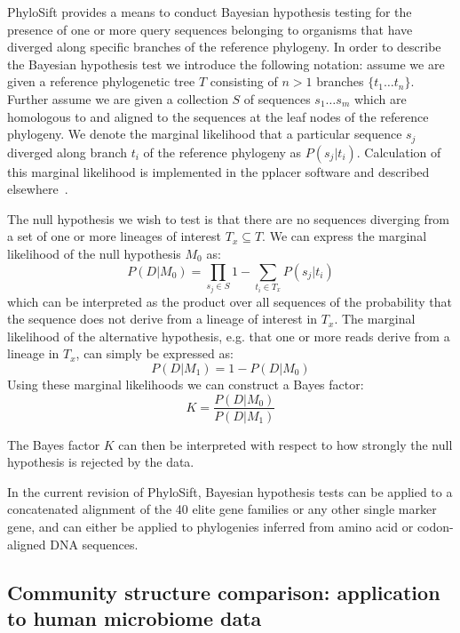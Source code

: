 \documentclass[10pt]{article}
\begin{document}
PhyloSift provides a means to conduct Bayesian hypothesis testing for the presence of one or more query sequences belonging to organisms that have diverged along specific branches of the reference phylogeny.
In order to describe the Bayesian hypothesis test we introduce the following notation: assume we are given a reference phylogenetic tree $T$ consisting of $n > 1$ branches $\{t_1 \dots t_n\}$. 
Further assume we are given a collection $S$ of sequences $s_1 \dots s_m$ which are homologous to and aligned to the sequences at the leaf nodes of the reference phylogeny. 
We denote the marginal likelihood that a particular sequence $s_j$ diverged along branch $t_i$ of the reference phylogeny as $P(s_j|t_i)$.
Calculation of this marginal likelihood is implemented in the pplacer software and described elsewhere~\cite{Matsen2010}.

The null hypothesis we wish to test is that there are no sequences diverging from a set of one or more lineages of interest $T_x \subseteq T$.
We can express the marginal likelihood of the null hypothesis $M_0$ as:
\begin{equation}\label{eqn:null}
P(D|M_0) = \prod_{s_j \in S} 1 - \sum_{t_i \in T_x} P(s_j|t_i)
\end{equation}
which can be interpreted as the product over all sequences of the probability that the sequence does not derive from a lineage of interest in $T_x$.
The marginal likelihood of the alternative hypothesis, e.g. that one or more reads derive from a lineage in $T_x$, can simply be expressed as:
\begin{equation}\label{eqn:alt}
P(D|M_1) = 1-P(D|M_0)
\end{equation}
Using these marginal likelihoods we can construct a Bayes factor:
\begin{equation}\label{eqn:bayesfactor}
K=\frac{P(D|M_0)}{P(D|M_1)}
\end{equation}

The Bayes factor $K$ can then be interpreted with respect to how strongly the null hypothesis is rejected by the data.

In the current revision of PhyloSift, Bayesian hypothesis tests can be applied to a concatenated alignment of the 40 elite gene families or any other single marker gene, and can either be applied to phylogenies inferred from amino acid or codon-aligned {DNA} sequences.

\subsection*{Community structure comparison: application to human microbiome data}
\end{document}
